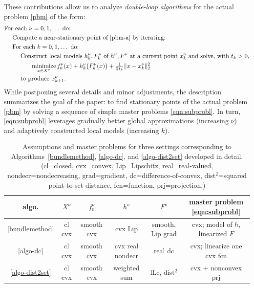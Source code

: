\documentclass[smallextended,envcountsect]{svjour3}
\newcommand{\nnmin}{\mathop{\rm minimize}}
\begin{document}
These contributions allow us to analyze {\em double-loop algorithms} for the actual problem \eqref{pbm} of the form: 
\begin{align}
&\text{For each $\nu= 0, 1, \dots$ do:}\nonumber\\ 
& ~~~~\text{Compute a near-stationary point of \eqref{pbm-a} by iterating:}\nonumber\\
& ~~~~\text{For each $k = 0, 1, \dots$ do:}\nonumber\\
& ~~~~~~~~\text{Construct local models $h_k^\nu, F_k^\nu$ of $h^\nu, F^\nu$ at a current point $x_k^\nu$ and solve, with $t_k>0$,}\nonumber\\ 
& ~~~~~~~~~~~~~\nnmin_{x\in X^\nu} f_0^\nu(x) + h_k^\nu\big(F_k^\nu(x)\big) + \tfrac{1}{2t_k} \|x - x_k^\nu\|_2^2\label{eqn:subprobl}\\
& ~~~~~~~~\text{to produce } x_{k+1}^\nu.\nonumber 
\end{align}
While postponing several details and minor adjustments, the description summarizes the goal of the paper: to find stationary points of the actual problem \eqref{pbm} by solving a sequence of simple master problems \eqref{eqn:subprobl}. In turn, \eqref{eqn:subprobl} leverages gradually better global approximations (increasing $\nu$) and adaptively constructed local models (increasing $k$).    


\begin{table}[h]
\centering
\begin{tabular}{c|c|c|c|c|c}
algo. & $X^\nu$ & $f_0^\nu$ & $h^\nu$ & $F^\nu$ & master problem \eqref{eqn:subprobl} \\
\hline
\ref{bundlemethod}  & cl cvx & smooth cvx & cvx Lip           & smooth, Lip grad    & cvx; model of $h$, linearized $F$ \\
\ref{algo-dc}       & cl cvx & smooth cvx & cvx real nondecr  & real dc& cvx; linearize one cvx fcn \\
\ref{algo-dist2set} & cl cvx & smooth cvx & weighted sum      & lLc, dist$^2$       & cvx $+$ nonconvex prj \\
\hline
\end{tabular}
\caption{Assumptions and master problems for three settings corresponding to Algorithms~\ref{bundlemethod}, \ref{algo-dc}, and \ref{algo-dist2set} developed in detail. (cl=closed, cvx=convex, Lip=Lipschitz, real=real-valued, nondecr=nondecreasing, grad=gradient, dc=difference-of-convex, dist$^2$=squared point-to-set distance, fcn=function, prj=projection.)}\label{tab:overview}
\end{table}
\end{document}
